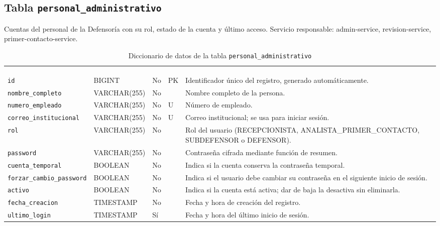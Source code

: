 \subsection{Tabla \texttt{personal\_administrativo}}
Cuentas del personal de la Defensoría con su rol, estado de la cuenta y último acceso. Servicio responsable: admin-service, revision-service, primer-contacto-service.


\footnotesize
\renewcommand{\arraystretch}{1.15}
\setlength{\tabcolsep}{4pt}
\begin{longtable}{|L{3.9cm}|L{2.4cm}|L{0.9cm}|L{1.2cm}|L{6.6cm}|}
	\hiderowcolors\caption{Diccionario de datos de la tabla \texttt{personal\_administrativo}}
	\label{tab:dic_personal_administrativo} \\ \showrowcolors
	\hline
	 &  &  &  &  \\
	\hline
	\endfirsthead
	\hline
	 &  &  &  &  \\
	\hline
	\endhead
		\texttt{id} & BIGINT & No & PK & Identificador único del registro, generado automáticamente. \\ \hline
		\texttt{nombre\_\allowbreak{}completo} & VARCHAR(255) & No &  & Nombre completo de la persona. \\ \hline
		\texttt{numero\_\allowbreak{}empleado} & VARCHAR(255) & No & U & Número de empleado. \\ \hline
		\texttt{correo\_\allowbreak{}institucional} & VARCHAR(255) & No & U & Correo institucional; se usa para iniciar sesión. \\ \hline
		\texttt{rol} & VARCHAR(255) & No &  & Rol del usuario (RECEPCIONISTA, ANALISTA\_PRIMER\_CONTACTO, SUBDEFENSOR o DEFENSOR). \\ \hline
		\texttt{password} & VARCHAR(255) & No &  & Contraseña cifrada mediante función de resumen. \\ \hline
		\texttt{cuenta\_\allowbreak{}temporal} & BOOLEAN & No &  & Indica si la cuenta conserva la contraseña temporal. \\ \hline
		\texttt{forzar\_\allowbreak{}cambio\_\allowbreak{}password} & BOOLEAN & No &  & Indica si el usuario debe cambiar su contraseña en el siguiente inicio de sesión. \\ \hline
		\texttt{activo} & BOOLEAN & No &  & Indica si la cuenta está activa; dar de baja la desactiva sin eliminarla. \\ \hline
		\texttt{fecha\_\allowbreak{}creacion} & TIMESTAMP & No &  & Fecha y hora de creación del registro. \\ \hline
		\texttt{ultimo\_\allowbreak{}login} & TIMESTAMP & Sí &  & Fecha y hora del último inicio de sesión. \\ \hline
\end{longtable}
\normalsize
\setlength{\tabcolsep}{6pt}
\renewcommand{\arraystretch}{1}

